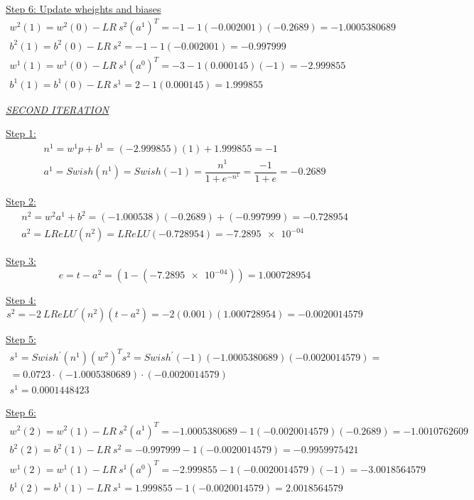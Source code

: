 \underline{Step 6: Update wheights and biases}
\[
\begin{gathered}
	w^{2}(1)=w^{2}(0)-LR\ s^{2}(a^{1})^{T} = -1 - 1(-0.002001)(-0.2689) = -1.0005380689\\
	 b^{2}(1)=b^{2}(0)-LR\ s^{2} = -1 - 1(-0.002001) = -0.997999 \\
	 w^{1}(1)=w^{1}(0)-LR\ s^{1}(a^{0})^{T} = -3 - 1(0.000145)(-1) = -2.999855 \\
	 b^{1}(1)=b^{1}(0)-LR\ s^{1} = 2 - 1(0.000145) = 1.999855
\end{gathered}
\]

\vspace*{1mm}
\begin{center}
	\underline{\textit{SECOND ITERATION}}
\end{center}

\underline{Step 1:}
\[
\begin{gathered}
	n^1 = w^1 p + b^1 = (-2.999855)(1) + 1.999855 = -1\\
	a^1 = {Swish}\left(n^1\right) = {Swish}\left(-1\right) = \dfrac{n^1}{1+e^{-n^1}} = \dfrac{-1}{1+e} = -0.2689
\end{gathered}
\]

\underline{Step 2:}
\[
\begin{gathered}
	n^2 = w^2 a^1 + b^2 = (-1.000538)(-0.2689) + (-0.997999) = -0.728954\\ 
	a^2 = {LReLU}\left(n^2\right) = {LReLU}\left(-0.728954\right) = \num{-7.2895e-04}
\end{gathered}
\]

\underline{Step 3:}
\[
e = t-a^2 = \left(1-\left( \num{-7.2895e-04}\right)\right) = 1.000728954
\]

\underline{Step 4:}
\[
s^2 = -2\ {LReLU}^{'}\left(n^2\right)\left(t-a^2\right) = -2 \left(0.001\right) \left(1.000728954\right) = -0.0020014579
\]

\underline{Step 5:}
\[
\begin{gathered}
s^1 = Swish^{'} \left(n^1\right) \left(w^2\right)^T s^2 = Swish^{'} \left(-1\right) \left(-1.0005380689\right) \left(-0.0020014579\right) = \\
= 0.0723 \cdot (-1.0005380689) \cdot \left(-0.0020014579\right) \\
s^1 = 0.0001448423
\end{gathered}
\]

\underline{Step 6:}
\[
\begin{gathered}
w^{2}(2)=w^{2}(1)-LR\ s^{2}(a^{1})^{T} = -1.0005380689 - 1(-0.0020014579)(-0.2689) = -1.0010762609\\
b^{2}(2)=b^{2}(1)-LR\ s^{2} = -0.997999 - 1(-0.0020014579) = -0.9959975421 \\
w^{1}(2)=w^{1}(1)-LR\ s^{1}(a^{0})^{T} =  -2.999855 - 1(-0.0020014579)(-1) = -3.0018564579 \\
b^{1}(2)=b^{1}(1)-LR\ s^{1} = 1.999855 - 1(-0.0020014579) = 2.0018564579
\end{gathered}
\]